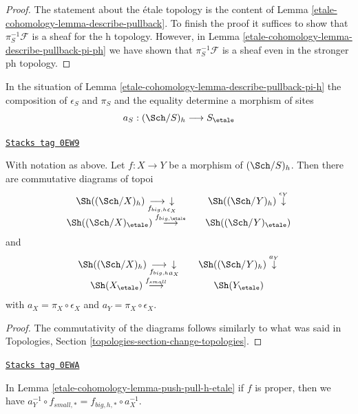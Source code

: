 \begin{proof}
The statement about the \'etale topology is the content
of Lemma \ref{etale-cohomology-lemma-describe-pullback}. To finish the proof it
suffices to show that $\pi_S^{-1}\mathcal{F}$ is a sheaf for the h
topology. However, in Lemma \ref{etale-cohomology-lemma-describe-pullback-pi-ph}
we have shown that
$\pi_S^{-1}\mathcal{F}$ is a sheaf even in the stronger ph
topology.
\end{proof}

In the situation of Lemma \ref{etale-cohomology-lemma-describe-pullback-pi-h}
the composition of $\epsilon_S$ and $\pi_S$ and the equality
determine a morphism of sites
$$
a_S : (\Sch/S)_h \longrightarrow S_\etale
$$

\begin{lemma}
\label{etale-cohomology-lemma-push-pull-h-etale}
\href{https://stacks.math.columbia.edu/tag/0EW9}{\texttt{Stacks tag 0EW9}}

With notation as above.
Let $f : X \to Y$ be a morphism of $(\Sch/S)_h$.
Then there are commutative diagrams of topoi
$$
\begin{array}{ccc}\Sh((\Sch/X)_h) \underset{f_{big, h}}{\longrightarrow}\underset{\epsilon_X}{\downarrow} &  & \Sh((\Sch/Y)_h) \overset{\epsilon_Y}{\downarrow} \\ \Sh((\Sch/X)_\etale) \overset{f_{big, \etale}}{\longrightarrow} &  & \Sh((\Sch/Y)_\etale)\end{array}
$$
and
$$
\begin{array}{ccc}\Sh((\Sch/X)_h) \underset{f_{big, h}}{\longrightarrow}\underset{a_X}{\downarrow} &  & \Sh((\Sch/Y)_h) \overset{a_Y}{\downarrow} \\ \Sh(X_\etale) \overset{f_{small}}{\longrightarrow} &  & \Sh(Y_\etale)\end{array}
$$
with $a_X = \pi_X \circ \epsilon_X$ and $a_Y = \pi_X \circ \epsilon_X$.
\end{lemma}

\begin{proof}
The commutativity of the diagrams follows similarly to what was said in
Topologies, Section \ref{topologies-section-change-topologies}.
\end{proof}

\begin{lemma}
\label{etale-cohomology-lemma-proper-push-pull-h-etale}
\href{https://stacks.math.columbia.edu/tag/0EWA}{\texttt{Stacks tag 0EWA}}

In Lemma \ref{etale-cohomology-lemma-push-pull-h-etale} if $f$ is proper, then we have
$a_Y^{-1} \circ f_{small, *} = f_{big, h, *} \circ a_X^{-1}$.
\end{lemma}

